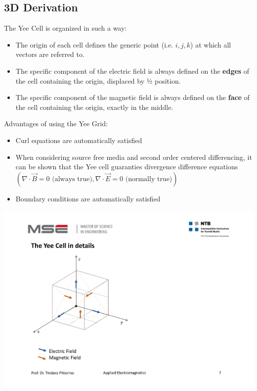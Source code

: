 \subsection{3D Derivation}
\begin{minipage}{12cm}
	The Yee Cell is organized in such a way: \\
	\begin{itemize}
		\item The origin of each cell defines the generic point (i.e. $i,j,k$) at which all vectors are referred to.
		\item The specific component of the electric field is always defined on the \textbf{edges} of the cell containing the origin, displaced by ½ position.
		\item The specific component of the magnetic field is always defined on the \textbf{face} of the cell containing the origin, exactly in the middle.
	\end{itemize}
	Advantages of using the Yee Grid: \\
	\begin{itemize}
		\item Curl equations are automatically satisfied
		\item When considering source free media and second order centered differencing, it can be shown that the Yee cell guaranties divergence difference equations \(\displaystyle \left(\nabla \cdot \vec{B} = 0 \textrm{ (always true)}, \nabla \cdot \vec{E} = 0 \textrm{ (normally true)} \right)\) 
		\item Boundary conditions are automatically satisfied
	\end{itemize}
\end{minipage}
\begin{minipage}{7cm}
	\begin{flushright}
	\includegraphics[width=.95\textwidth]{./images/Yee.pdf}
	\end{flushright}
\end{minipage}

